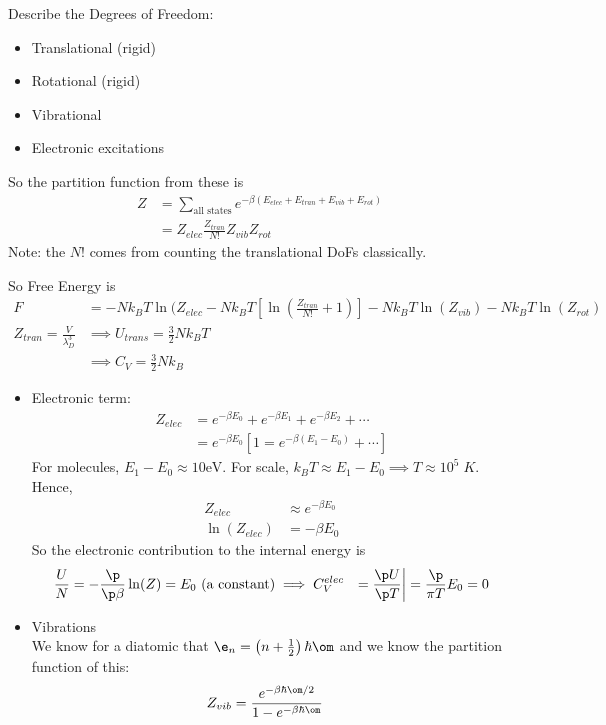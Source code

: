 \documentclass[a4paper, 11pt, normalem]{report}
\begin{document}
\begin{example}
    Describe the Degrees of Freedom:
    \begin{itemize}
        \item Translational (rigid)
        \item Rotational (rigid)
        \item Vibrational
        \item Electronic excitations
    \end{itemize}
    So the partition function from these is
    \begin{align}
        Z &= \sum_{\text{all states}} e^{-\beta\left(E_{elec}+E_{tran}+E_{vib}+E_{rot}\right)} \\
          &= Z_{elec}\frac{Z_{tran}}{N!}Z_{vib}Z_{rot}
    \end{align}
    Note: the $N!$ comes from counting the translational DoFs classically. 
    
    So Free Energy is
    \begin{align}
        F &= -Nk_BT\ln(Z_{elec} - Nk_BT\left[\ln\left(\frac{Z_{tran}}{N!}+1\right)\right] - Nk_BT\ln(Z_{vib}) - Nk_BT\ln(Z_{rot}) \\
        Z_{tran} = \frac{V}{\lambda_D^3} &\implies U_{trans} = \frac{3}{2}Nk_BT \\
                                         &\implies C_V = \frac{3}{2}Nk_B
    \end{align}
    \begin{itemize}
        \item Electronic term:
            \begin{align} 
                Z_{elec} &= e^{-\beta E_0} + e^{-\beta E_1} + e^{-\beta E_2} + \cdots \\
                         &= e^{-\beta E_0}\left[1 = e^{-\beta(E_1-E_0)} + \cdots\right] 
            \end{align}
            For molecules, $E_1-E_0 \approx 10\text{eV}$.
            For scale, $k_BT \approx E_1-E_0 \implies T \approx 10^5\;K$.
            Hence, 
            \begin{align}
                Z_{elec} &\approx e^{-\beta E_0} \\
                \ln(Z_{elec}) &= -\beta E_0
            \end{align}
            So the electronic contribution to the internal energy is
            \begin{align}
                \frac{U}{N} &= -\frac{\p}{\p\beta}\ln(Z) = E_0 \text{ (a constant)}
                \implies C_V^{elec} &= \frac{\p U}{\p T}\bigg| = \frac{\p}{\pi T} E_0 = 0
            \end{align}
        \item Vibrations \\
            We know for a diatomic that $\e_n = \left(n+\frac{1}{2}\right)\hbar\om$ and we know the partition function of this:
            \begin{align}
                Z_{vib} &= \frac{e^{-\beta\hbar\om/2}}{1 - e^{-\beta\hbar\om}}
            \end{align}
    \end{itemize}
\end{example}
\end{document}
